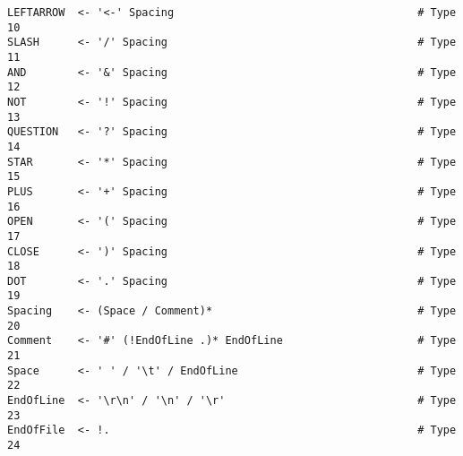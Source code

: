 \documentclass[diploma]{softlab-thesis}
\begin{document}
\begin{Verbatim}
LEFTARROW  <- '<-' Spacing                                      # Type 10
SLASH      <- '/' Spacing                                       # Type 11
AND        <- '&' Spacing                                       # Type 12
NOT        <- '!' Spacing                                       # Type 13
QUESTION   <- '?' Spacing                                       # Type 14
STAR       <- '*' Spacing                                       # Type 15
PLUS       <- '+' Spacing                                       # Type 16
OPEN       <- '(' Spacing                                       # Type 17
CLOSE      <- ')' Spacing                                       # Type 18
DOT        <- '.' Spacing                                       # Type 19
Spacing    <- (Space / Comment)*                                # Type 20
Comment    <- '#' (!EndOfLine .)* EndOfLine                     # Type 21
Space      <- ' ' / '\t' / EndOfLine                            # Type 22
EndOfLine  <- '\r\n' / '\n' / '\r'                              # Type 23
EndOfFile  <- !.                                                # Type 24
\end{Verbatim}

\end{document}
